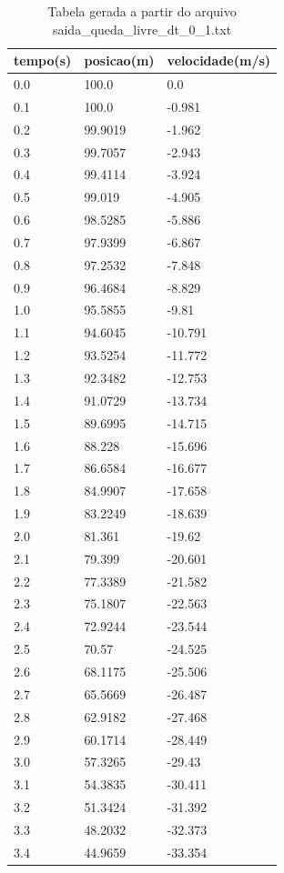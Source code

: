 \begin{table}
\caption{Tabela gerada a partir do arquivo saida\_queda\_livre\_dt\_0\_1.txt}
\label{tab:saida_queda_livre_dt_0_1}
\begin{tabular}{lll}
\toprule
tempo(s) & posicao(m) & velocidade(m/s) \\
\midrule
0.0 & 100.0 & 0.0 \\
0.1 & 100.0 & -0.981 \\
0.2 & 99.9019 & -1.962 \\
0.3 & 99.7057 & -2.943 \\
0.4 & 99.4114 & -3.924 \\
0.5 & 99.019 & -4.905 \\
0.6 & 98.5285 & -5.886 \\
0.7 & 97.9399 & -6.867 \\
0.8 & 97.2532 & -7.848 \\
0.9 & 96.4684 & -8.829 \\
1.0 & 95.5855 & -9.81 \\
1.1 & 94.6045 & -10.791 \\
1.2 & 93.5254 & -11.772 \\
1.3 & 92.3482 & -12.753 \\
1.4 & 91.0729 & -13.734 \\
1.5 & 89.6995 & -14.715 \\
1.6 & 88.228 & -15.696 \\
1.7 & 86.6584 & -16.677 \\
1.8 & 84.9907 & -17.658 \\
1.9 & 83.2249 & -18.639 \\
2.0 & 81.361 & -19.62 \\
2.1 & 79.399 & -20.601 \\
2.2 & 77.3389 & -21.582 \\
2.3 & 75.1807 & -22.563 \\
2.4 & 72.9244 & -23.544 \\
2.5 & 70.57 & -24.525 \\
2.6 & 68.1175 & -25.506 \\
2.7 & 65.5669 & -26.487 \\
2.8 & 62.9182 & -27.468 \\
2.9 & 60.1714 & -28.449 \\
3.0 & 57.3265 & -29.43 \\
3.1 & 54.3835 & -30.411 \\
3.2 & 51.3424 & -31.392 \\
3.3 & 48.2032 & -32.373 \\
3.4 & 44.9659 & -33.354 \\

\end{tabular}
\end{table}
